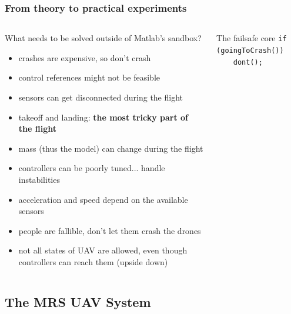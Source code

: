\documentclass[aspectratio=1610]{beamer}
\begin{document}
  \begin{frame}
    \frametitle{From theory to practical experiments}

    \begin{columns}[c]

      \begin{block}{What needs to be solved outside of Matlab's sandbox?}
        \begin{itemize}
          \item crashes are expensive, so don't crash
          \item control references might not be feasible
          \item sensors can get disconnected during the flight
          \item takeoff and landing: \textbf{the most tricky part of the flight}
          \item mass (thus the model) can change during the flight
          \item controllers can be poorly tuned... handle instabilities
          \item acceleration and speed depend on the available sensors
          \item people are fallible, don't let them crash the drones
          \item not all states of UAV are allowed, even though controllers can reach them (upside down)
        \end{itemize}
      \end{block}

      \begin{block}{The failsafe core}
        \texttt{if (goingToCrash())}\\
        \texttt{~~~~dont();}
      \end{block}

    \end{columns}

  \end{frame}



  \subsection{The MRS UAV System}
\end{document}
